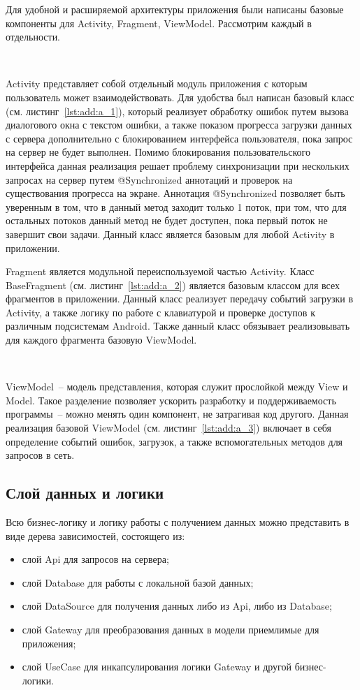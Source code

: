 Для удобной и расширяемой архитектуры приложения были написаны базовые компоненты для Activity, Fragment, ViewModel. Рассмотрим каждый в отдельности.

~\par
Activity представляет собой отдельный модуль приложения с которым пользователь может взаимодействовать. Для удобства был написан базовый класс (см. листинг~\ref{lst:add:a_1}), который реализует обработку ошибок путем вызова диалогового окна с текстом ошибки, а также показом прогресса загрузки данных с сервера дополнительно с блокированием интерфейса пользователя, пока запрос на сервер не будет выполнен. Помимо блокирования пользовательского интерфейса данная реализация решает проблему синхронизации при нескольких запросах на сервер путем @Synchronized аннотаций и проверок на существования прогресса на экране. Аннотация @Synchronized позволяет быть уверенным в том, что в данный метод заходит только 1 поток, при том, что для остальных потоков данный метод не будет доступен, пока первый поток не завершит свои задачи. Данный класс является базовым для любой Activity в приложении.
~\par
Fragment является модульной переиспользуемой частью Activity. Класс BaseFragment (см. листинг~\ref{lst:add:a_2}) является базовым классом для всех фрагментов в приложении. Данный класс реализует передачу событий загрузки в Activity, а также логику по работе с клавиатурой и проверке доступов к различным подсистемам Android. Также данный класс обязывает реализовывать для каждого фрагмента базовую ViewModel.

~\par
ViewModel~-- модель представления, которая служит прослойкой между View и Model. Такое разделение позволяет ускорить разработку и поддерживаемость программы~-- можно менять один компонент, не затрагивая код другого. Данная реализация базовой ViewModel (см. листинг~\ref{lst:add:a_3}) включает в себя определение событий ошибок, загрузок, а также вспомогательных методов для запросов в сеть.

\subsection{Слой данных и логики}
Всю бизнес-логику и логику работы с получением данных можно представить в виде дерева зависимостей, состоящего из:

\begin{itemize}
  \item слой Api для запросов на сервера;
  \item слой Database для работы с локальной базой данных;
  \item слой DataSource для получения данных либо из Api, либо из Database;
  \item слой Gateway для преобразования данных в модели приемлимые для приложения;
  \item слой UseCase для инкапсулирования логики Gateway и другой бизнес-логики.
\end{itemize}

